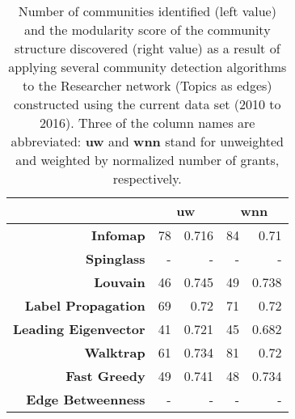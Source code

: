 \begin{table}[!htbp]
\centering
\caption[Number of communities and modularity score of community structure identified within the Researcher network (Topics as edges) constructed using the current data set (2010 to 2016)]{Number of communities identified (left value) and the modularity score of the community structure discovered (right value) as a result of applying several community detection algorithms to the Researcher network (Topics as edges) constructed using the current data set (2010 to 2016). Three of the column names are abbreviated: \textbf{uw} and \textbf{wnn} stand for unweighted and weighted by normalized number of grants, respectively.}
\label{table:researcher_a_current_modularity_appendix}
\begin{tabular}{r|rr|rr}
\textbf{} & \multicolumn{2}{c|}{\textbf{uw}} & \multicolumn{2}{c}{\textbf{wnn}}\\
\hline
\textbf{Infomap} & {78} & {0.716} & {84} & {0.71}\\
\textbf{Spinglass} & {-} & {-} & {-} & {-}\\
\textbf{Louvain} & {46} & {0.745} & {49} & {0.738}\\
\textbf{Label Propagation} & {69} & {0.72} & {71} & {0.72}\\
\textbf{Leading Eigenvector} & {41} & {0.721} & {45} & {0.682}\\
\textbf{Walktrap} & {61} & {0.734} & {81} & {0.72}\\
\textbf{Fast Greedy} & {49} & {0.741} & {48} & {0.734}\\
\textbf{Edge Betweenness} & {-} & {-} & {-} & {-}
\end{tabular}
\end{table}

